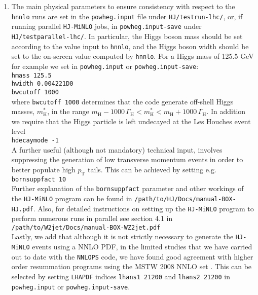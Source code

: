 \documentclass[11pt,a4paper]{article}
\newcommand{\noun}[1]{{\tt #1}}
\newcommand{\LHAPDF}{\noun{LHAPDF}}
\newcommand{\HJMINLO}{\noun{HJ-MiNLO}}
\newcommand{\HNNLO}{\noun{hnnlo}}
\newcommand{\NNLOPS}{\noun{NNLOPS}}
\begin{document}
\begin{enumerate}
\item  The main physical parameters to ensure consistency with respect to
  the \HNNLO{} runs are set in the {\tt{powheg.input}} file under
  {\tt{HJ/testrun-lhc/}},
  or, if running parallel \HJMINLO{} jobs, in {\tt{powheg.input-save}}
  under {\tt{HJ/testparallel-lhc/}}. In particular, the Higgs boson mass
  should be set according to the value input to \HNNLO{}, and the
  Higgs boson width should be set to the
  on-screen value computed by \HNNLO{}.
  For a Higgs mass of 125.5 GeV for example we set in
  {\tt{powheg.input}}  or {\tt{powheg.input-save}}:\vspace{3mm}\\
  {\tt{hmass 125.5}}\\
  {\tt{hwidth 0.004221D0}}\\
  {\tt{bwcutoff 1000}}\vspace{3mm}\\
  where {\tt{bwcutoff 1000}} determines that the code generate off-shell
  Higgs masses, ${m_{\scriptscriptstyle{\mathrm{H}}}^{*}}$, in the range
  ${m_{\scriptscriptstyle{\mathrm{H}}}}-1000\,{\Gamma_{\scriptscriptstyle{\mathrm{H}}}}<{m_{\scriptscriptstyle{\mathrm{H}}}^{*}}<{m_{\scriptscriptstyle{\mathrm{H}}}}+1000\,{\Gamma_{\scriptscriptstyle{\mathrm{H}}}}$. In addition we require that the Higgs
  particle is left undecayed at the Les Houches event level\vspace{3mm}\\
  {\tt{hdecaymode -1}}\vspace{3mm}\\
  A further useful (although not mandatory) technical input, involves
  suppressing the generation of low transverse momentum events in order
  to better  populate high ${p_{\scriptscriptstyle{\mathrm{T}}}}$ tails. This can
  be achieved by setting e.g.\vspace{3mm}\\
  {\tt{bornsuppfact 10}}\vspace{3mm}\\
  Further explanation of the {\tt{bornsuppfact}} parameter and other workings
  of the \HJMINLO{} program can be found in
  {\tt{/path/to/HJ/Docs/manual-BOX-HJ.pdf}}. Also, for detailed instructions
  on setting up the \HJMINLO{} program to perform numerous runs in parallel
  see section 4.1 in
  {\tt{/path/to/W2jet/Docs/manual-BOX-WZ2jet.pdf}}\vspace{3mm}\\
  Lastly, we add that although
  it is not strictly necessary to generate the \HJMINLO{} events using a
  NNLO PDF, in the limited studies that we have carried out to date with
  the \NNLOPS{} code, we have found good agreement with higher order 
  resummation programs using the MSTW 2008 NNLO set \cite{Martin:2009iq}.
  This can be selected by setting \LHAPDF{} indices\vspace{3mm}
  {\tt{lhans1   21200}} and
  {\tt{lhans2   21200}} 
  in {\tt{powheg.input}} or {\tt{powheg.input-save}}.


\end{enumerate}
\end{document}
